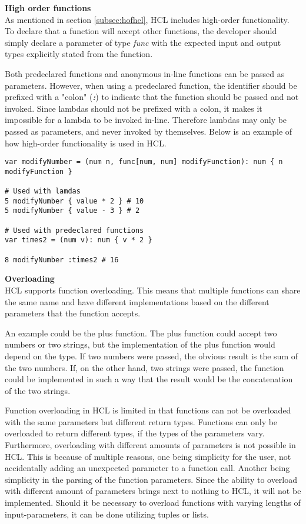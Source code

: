 \textbf{High order functions}\\
As mentioned in section \ref{subsec:hofhcl}, HCL includes high-order functionality. 
To declare that a function will accept other functions, the developer should simply declare a parameter of type \textit{func} with the expected input and output types explicitly stated from the function.

Both predeclared functions and anonymous in-line functions can be passed as parameters. 
However, when using a predeclared function, the identifier should be prefixed with a "colon" (\textit{\textbf{:}}) to indicate that the function should be passed and not invoked. 
Since lambdas should not be prefixed with a colon, it makes it impossible for a lambda to be invoked in-line. 
Therefore lambdas may only be passed as parameters, and never invoked by themselves.
Below is an example of how high-order functionality is used in HCL.
\begin{lstlisting}[language=HCL,label=lis:hclTypeDcls,firstnumber=1]
var modifyNumber = (num n, func[num, num] modifyFunction): num { n modifyFunction }

# Used with lamdas
5 modifyNumber { value * 2 } # 10
5 modifyNumber { value - 3 } # 2

# Used with predeclared functions
var times2 = (num v): num { v * 2 }

8 modifyNumber :times2 # 16

\end{lstlisting}

\textbf{Overloading}\\
HCL supports function overloading. 
This means that multiple functions can share the same name and have different implementations based on the different parameters that the function accepts.

An example could be the plus function. 
The plus function could accept two numbers or two strings, but the implementation of the plus function would depend on the type.
If two numbers were passed, the obvious result is the sum of the two numbers.
If, on the other hand, two strings were passed, the function could be implemented in such a way that the result would be the concatenation of the two strings.

Function overloading in HCL is limited in that functions can not be overloaded with the same parameters but different return types. 
Functions can only be overloaded to return different types, if the types of the parameters vary.
Furthermore, overloading with different amounts of parameters is not possible in HCL.
This is because of multiple reasons, one being simplicity for the user, not accidentally adding an unexpected parameter to a function call. 
Another being simplicity in the parsing of the function parameters. 
Since the ability to overload with different amount of parameters brings next to nothing to HCL, it will not be implemented.
Should it be necessary to overload functions with varying lengths of input-parameters, it can be done utilizing tuples or lists.

